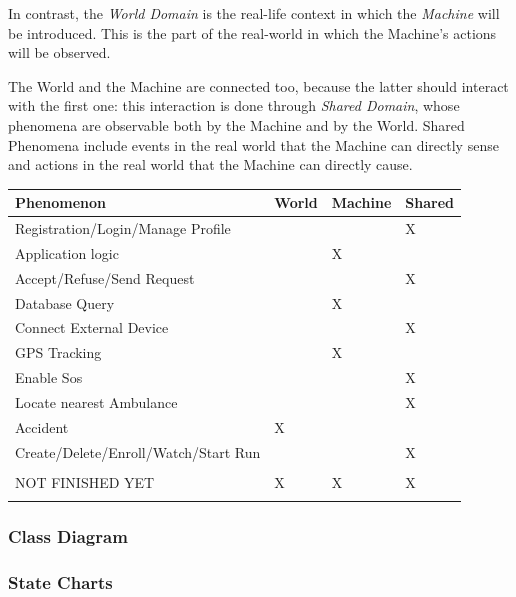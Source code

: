 \documentclass[a4paper]{article}
\begin{document}
    In contrast, the \textit{World Domain} is the real-life context in which the \textit{Machine} will be introduced. This is the part of the real-world in which the Machine’s actions will be observed.
    
    The World and the Machine are connected too, because the latter should interact with the first one: this interaction is done through \textit{Shared Domain}, whose phenomena are observable both by the Machine and by the World. Shared Phenomena include events in the real world that the Machine can directly sense and actions in the real world that the Machine can directly cause.
    \begin{table}[!ht]
    \centering
    \begin{tabular}{|l|l|l|l|}
    \hline
     \textbf{Phenomenon} & \textbf{World} & \textbf{Machine} & \textbf{Shared}\\ \hline
     Registration/Login/Manage Profile & & & X \\ \hline
     Application logic & & X & \\ \hline
     Accept/Refuse/Send Request & & & X \\ \hline
     Database Query & & X & \\ \hline
     Connect External Device & & & X \\ \hline
     GPS Tracking & & X & \\ \hline
     Enable Sos & & & X \\ \hline
     Locate nearest Ambulance & & & X \\ \hline
     Accident & X & & \\ \hline
     Create/Delete/Enroll/Watch/Start Run & & & X \\ \hline
     & & & \\ \hline
     NOT FINISHED YET & X & X & X \\ \hline
     & & & \\ \hline
    \end{tabular}
    \end{table}
    
    
    \subsubsection{Class Diagram}
    
    \subsubsection{State Charts}
    
\end{document}
